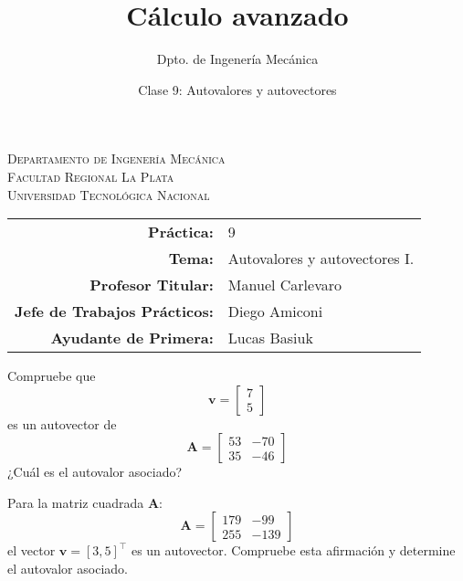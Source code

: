 \documentclass[11pt]{article}
\title{Cálculo avanzado}
\author{Dpto. de Ingenería Mecánica}
\date{Clase 9: Autovalores y autovectores}
\begin{document}

\begin{center}
\end{center} 

\begin{center}
\vspace{\baselineskip}
\Large{\textsc{Departamento de Ingenería Mecánica}} \\
\textsc{Facultad Regional La Plata} \\
\textsc{Universidad Tecnológica Nacional}
\end{center}


\begin{center}
\begin{tabular}{r l}
    \textbf{Práctica:} & 9 \\
 \textbf{Tema:} & Autovalores y autovectores I. \\
 \textbf{Profesor Titular:} & Manuel Carlevaro \\
 \textbf{Jefe de Trabajos Prácticos:} & Diego Amiconi \\
 \textbf{Ayudante de Primera:} & Lucas Basiuk 
\end{tabular}\end{center}

\vspace{1em}
\begin{question}
Compruebe que 
\[ \bm{v} = \begin{bmatrix} 7 \\ 5 \end{bmatrix} \]
es un autovector de 
\[ \bm{A} = 
    \begin{bmatrix}
        53 & -70 \\
        35 & -46
    \end{bmatrix} \]
    ¿Cuál es el autovalor asociado?
\end{question}

\begin{question} %

Para la matriz cuadrada $\bm{A}$:
    \[ \bm{A} = \begin{bmatrix} 179 & -99 \\
                255 & -139 \end{bmatrix} \]
el vector $\bm{v} = [3, 5]^{\intercal}$ es un autovector. Compruebe esta afirmación y determine el autovalor asociado.
\end{question}
\end{document}
